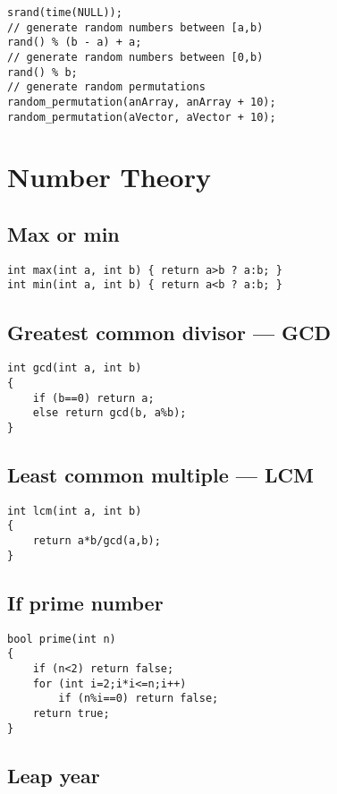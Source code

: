 \documentclass[a4paper]{article}
\begin{document}
\begin{verbatim}
srand(time(NULL));
// generate random numbers between [a,b)
rand() % (b - a) + a;
// generate random numbers between [0,b)
rand() % b; 
// generate random permutations
random_permutation(anArray, anArray + 10);
random_permutation(aVector, aVector + 10);
\end{verbatim}
	
\section{Number Theory}

\subsection{Max or min}
\begin{verbatim}
int max(int a, int b) { return a>b ? a:b; }
int min(int a, int b) { return a<b ? a:b; }
\end{verbatim}

\subsection{Greatest common divisor --- GCD}

\begin{verbatim}
int gcd(int a, int b)
{
	if (b==0) return a;
	else return gcd(b, a%b);
}
\end{verbatim}

\subsection{Least common multiple --- LCM}

\begin{verbatim}
int lcm(int a, int b)
{
	return a*b/gcd(a,b);
}
\end{verbatim}

\subsection{If prime number}

\begin{verbatim}
bool prime(int n)
{
	if (n<2) return false;
	for (int i=2;i*i<=n;i++)
		if (n%i==0) return false;
	return true;
}
\end{verbatim}

\subsection{Leap year}
\end{document}
